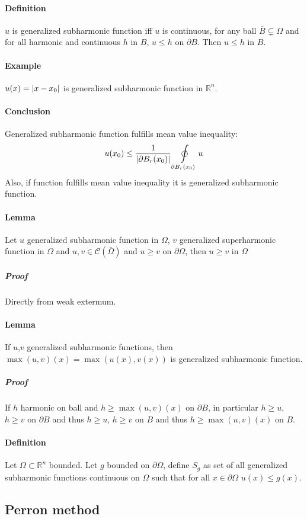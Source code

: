 \paragraph{Definition} $u$ is generalized subharmonic function iff $u$ is continuous, for any ball $\bar{B} \subsetneq \Omega$ and for all harmonic and continuous $h$ in $B$, $u\leq h$ on $\partial B$. Then $u\leq h$ in $B$.
\paragraph{Example} $u(x) = \abs{x-x_0}$ is generalized subharmonic function  in $\mathbb{R}^n$.
\paragraph{Conclusion} Generalized subharmonic function fulfills mean value inequality:
$$u(x_0) \leq \frac{1}{\abs{\partial B_r(x_0)}} \oint\limits_{\partial B_r(x_0)} u$$
Also, if function fulfills mean value inequality it is generalized subharmonic function.
\paragraph{Lemma} Let $u$ generalized subharmonic function in $\Omega$, $v$ generalized superharmonic function in $\Omega$ and $u,v \in \mathcal{C}(\bar{\Omega})$ and $u\geq v$ on $\partial \Omega$, then $u \geq v$ in $\Omega$ 
\subparagraph{Proof} Directly from weak extermum.
\paragraph{Lemma}
If $u$,$v$  generalized subharmonic functions, then $\max(u,v)(x) = \max(u(x), v(x))$ is  generalized subharmonic function.
\subparagraph{Proof}
If $h$ harmonic on ball and $h\geq\max(u,v)(x)$ on $\partial B$, in particular $h\geq u$, $h\geq v$ on $\partial B$ and thus $h\geq u$, $h\geq v$ on $B$ and thus $h\geq\max(u,v)(x)$ on $B$.
\paragraph{Definition} Let $\Omega \subset \mathbb{R}^n$ bounded. Let $g$ bounded on $\partial \Omega$, define $S_g$ as set of all generalized subharmonic functions continuous on $\Omega$ such that for all $x\in \partial \Omega$ $u(x) \leq g(x)$.
\subsection{Perron method}
